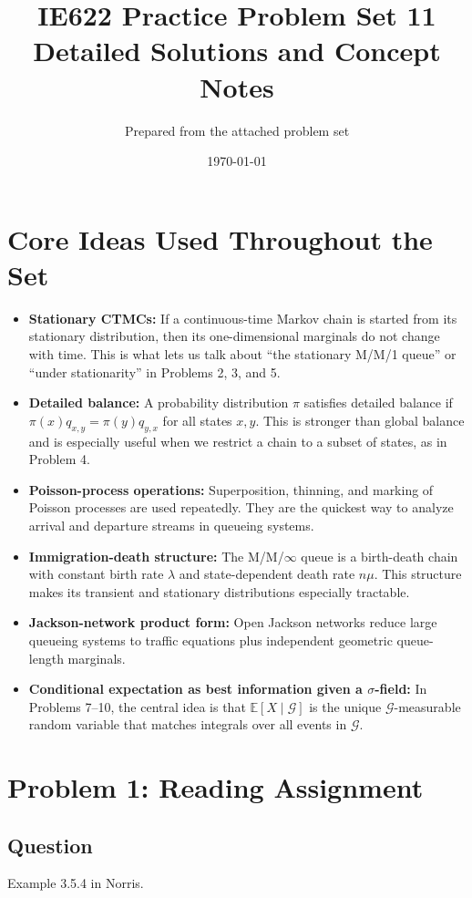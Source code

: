 \documentclass[11pt,a4paper]{article}
\title{IE622 Practice Problem Set 11\\Detailed Solutions and Concept Notes}
\author{Prepared from the attached problem set}
\date{\today}
\newcommand{\E}{\mathbb{E}}
\newcommand{\1}{\mathbf{1}}
\newcommand{\cG}{\mathcal{G}}
\begin{document}
\maketitle
\tableofcontents
\newpage

\section*{Core Ideas Used Throughout the Set}
\begin{itemize}
  \item \textbf{Stationary CTMCs:} If a continuous-time Markov chain is started from its stationary distribution, then its one-dimensional marginals do not change with time. This is what lets us talk about ``the stationary M/M/1 queue'' or ``under stationarity'' in Problems 2, 3, and 5.
  \item \textbf{Detailed balance:} A probability distribution $\pi$ satisfies detailed balance if $\pi(x)q_{x,y}=\pi(y)q_{y,x}$ for all states $x,y$. This is stronger than global balance and is especially useful when we restrict a chain to a subset of states, as in Problem 4.
  \item \textbf{Poisson-process operations:} Superposition, thinning, and marking of Poisson processes are used repeatedly. They are the quickest way to analyze arrival and departure streams in queueing systems.
  \item \textbf{Immigration-death structure:} The M/M/$\infty$ queue is a birth-death chain with constant birth rate $\lambda$ and state-dependent death rate $n\mu$. This structure makes its transient and stationary distributions especially tractable.
  \item \textbf{Jackson-network product form:} Open Jackson networks reduce large queueing systems to traffic equations plus independent geometric queue-length marginals.
  \item \textbf{Conditional expectation as best information given a $\sigma$-field:} In Problems 7--10, the central idea is that $\E[X\mid \cG]$ is the unique $\cG$-measurable random variable that matches integrals over all events in $\cG$.
\end{itemize}

\section{Problem 1: Reading Assignment}
\subsection*{Question}
Example 3.5.4 in Norris.
\end{document}
